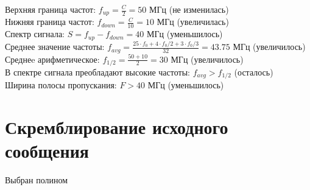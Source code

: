 \documentclass{article}
\begin{document}
Верхняя граница частот: $f_{up} = \frac{C}{2} = 50$ МГц (не изменилась)
\\
Нижняя граница частот: $f_{down} = \frac{C}{10} = 10$ МГц (увеличилась)
\\
Спектр сигнала: $S = f_{up} - f_{down} = 40$ МГц (уменьшилось)
\\
Среднее значение частоты: $f_{avg} = \frac{25\cdot f_0 + 4\cdot f_0/2 + 3\cdot f_0/3}{32} = 43.75$ МГц (увеличилось)
\\
Среднеe арифметическое: $f_{1/2} = \frac{50 + 10}{2} = 30$ МГц (увеличилось)
\\
В спектре сигнала преобладают высокие частоты: $f_{avg} > f_{1/2}$ (осталось)
\\
Ширина полосы пропускания: $F > 40$ МГц (уменьшилось)

\section{Скремблирование исходного сообщения}
Выбран полином
\end{document}

